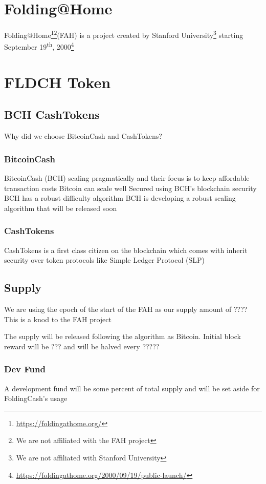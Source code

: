 \documentclass[letterpaper,12pt,titlepage]{article}
\def\org{FoldingCash}
\def\ticker{FLDCH}
\def\tokenSupply{????}
\def\initReward{???}
\def\halvingLength{?????}
\def\fahWebsite{\url{https://foldingathome.org/}}
\def\fahLaunchDate{September 19\textsuperscript{th}, 2000}
\def\fahLaunchReference{\url{https://foldingathome.org/2000/09/19/public-launch/}}
\begin{document}
\section{Folding@Home}
Folding@Home\footnote{\fahWebsite}\footnote{We are not affiliated with the FAH project}(FAH) is a project created by Stanford University\footnote{We are not affiliated with Stanford University} starting \fahLaunchDate\footnote{\fahLaunchReference}

\section{\ticker{} Token}

\subsection{BCH CashTokens}
Why did we choose BitcoinCash and CashTokens?

\subsubsection{BitcoinCash}
BitcoinCash (BCH) scaling pragmatically and their focus is to keep affordable transaction costs
Bitcoin can scale well
Secured using BCH's blockchain security
BCH has a robust difficulty algorithm
BCH is developing a robust scaling algorithm that will be released soon

\subsubsection{CashTokens}
CashTokens is a first class citizen on the blockchain which comes with inherit security over token protocols like Simple Ledger Protocol (SLP)

\subsection{Supply}
We are using the epoch of the start of the FAH as our supply amount of \tokenSupply{}
This is a knod to the FAH project

The supply will be released following the algorithm as Bitcoin. Initial block reward will be \initReward{} and will be halved every \halvingLength{}

\subsubsection{Dev Fund}
A development fund will be some percent of total supply and will be set aside for \org{'s} usage
\end{document}
